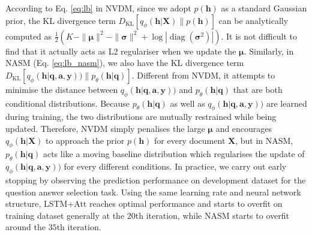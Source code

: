 \documentclass{article}
\newcommand{\tmmathbf}[1]{\ensuremath{\boldsymbol{#1}}}
\newcommand{\tmop}[1]{\ensuremath{\operatorname{#1}}}
\begin{document}
According to Eq. \ref{eq:lb} in NVDM, since we adopt $p(\tmmathbf{h})$ as a standard Gaussian prior, the KL divergence term $D_{\tmop{KL}} [q_{\phi} ( \tmmathbf{h} | \tmmathbf{X})\|p (\tmmathbf{h} )]$ can be analytically computed as $\frac{1}{2}(K-\| \tmmathbf{\mu} \|^2 - \| \tmmathbf{\sigma} \|^2 + \log | \tmop{diag} ( \tmmathbf{\sigma}^2) |)$. It is not difficult to find that it actually acts as L2 regulariser when we update the $\tmmathbf{\mu}$. 
Similarly, in NASM (Eq. \ref{eq:lb_nasm}), we also have the KL divergence term $D_{\tmop{KL}} [q_{\phi} ( \tmmathbf{h} | \tmmathbf{q}, \tmmathbf{a}, \tmmathbf{y}))\|p_{\theta} ( \tmmathbf{h} | \tmmathbf{q}) ]$. 
Different from NVDM, it attempts to minimise the distance between $q_{\phi} ( \tmmathbf{h} | \tmmathbf{q}, \tmmathbf{a}, \tmmathbf{y}))$ and $p_{\theta} ( \tmmathbf{h} | \tmmathbf{q})$ that are both conditional distributions. 
Because $p_{\theta} ( \tmmathbf{h} | \tmmathbf{q})$ as well as $q_{\phi} ( \tmmathbf{h} | \tmmathbf{q}, \tmmathbf{a}, \tmmathbf{y}))$ are learned during training, the two distributions are mutually restrained while being updated. 
Therefore, NVDM simply penalises the large $\tmmathbf{\mu}$ and encourages $q_{\phi} ( \tmmathbf{h} | \tmmathbf{X})$ to approach the prior $p(\tmmathbf{h})$ for every document $\tmmathbf{X}$, 
but in NASM, $p_{\theta} ( \tmmathbf{h} | \tmmathbf{q})$ acts like a moving baseline distribution which regularises the update of $q_{\phi} ( \tmmathbf{h} | \tmmathbf{q}, \tmmathbf{a}, \tmmathbf{y}))$ for every different conditions. 
In practice, we carry out early stopping by observing the prediction performance on development dataset for the question answer selection task. Using the same learning rate and neural network structure, LSTM+Att reaches optimal performance and starts to overfit on training dataset generally at the $20$th iteration, while NASM starts to overfit around the $35$th iteration. 
\end{document}
